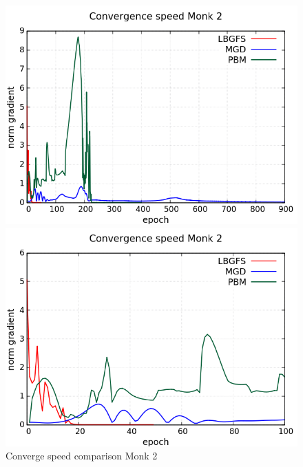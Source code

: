 \begin{figure}[H]
	\centering
	\begin{minipage}[t]{0.5\linewidth}
		\includegraphics[width=\linewidth]{data/Comparison/Monk2/Monk2_CS_Comparison_standard.png}
	\end{minipage}%
	\begin{minipage}[t]{0.5\linewidth}
		\includegraphics[width=\linewidth]{data/Comparison/Monk2/Monk2_CS_Comparison_zoom.png}
	\end{minipage}
	 \caption{Converge speed comparison Monk 2}
	 \label{CS-Monk2}
\end{figure}
